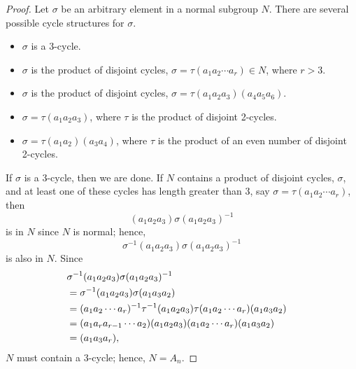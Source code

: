 {%
 
 
\begin{proof}
Let $\sigma$ be an arbitrary element in a normal subgroup $N$. There
are several possible cycle structures for $\sigma$.
\begin{itemize}
 
\item
$\sigma$ is a 3-cycle.
 
\item
$\sigma$ is the product of disjoint cycles, $\sigma = \tau(a_1 a_2
\cdots a_r) \in N$, where $r >3$.
 
 
\item
$\sigma$ is the product of disjoint cycles, $\sigma = \tau(a_1 a_2
a_3)(a_4 a_5 a_6)$.
 
 
\item
$\sigma = \tau(a_1 a_2 a_3)$, where $\tau$ is the product of disjoint
2-cycles. 
 
 
\item
$\sigma =
\tau (a_1 a_2) (a_3 a_4) $, where $\tau$ is the product of an even
number of disjoint 2-cycles. 
 
 
\end{itemize}
If $\sigma$ is a $3$-cycle, then we are done. If $N$ contains a
product of disjoint cycles, $\sigma$, and at least one of these cycles
has length greater than 3, say $\sigma = \tau(a_1 a_2 \cdots a_r)$,
then   
\[
(a_1 a_2 a_3)\sigma(a_1 a_2 a_3)^{-1}
\]
is in $N$ since $N$ is normal; hence,
\[
\sigma^{-1}(a_1 a_2 a_3)\sigma(a_1 a_2 a_3)^{-1}
\]
is also in $N$. Since
\begin{align*}
\lefteqn{\sigma^{-1}(a_1 a_2 a_3)\sigma(a_1 a_2 a_3)^{-1} } \\
& = \sigma^{-1}(a_1 a_2 a_3)\sigma(a_1 a_3 a_2) \\
& = (a_1 a_2 \cdots a_r)^{-1}\tau^{-1}(a_1 a_2 a_3) 
      \tau(a_1 a_2 \cdots a_r)(a_1 a_3 a_2) \\
& = (a_1 a_r a_{r-1} \cdots a_2 )(a_1 a_2 a_3) 
      (a_1 a_2 \cdots a_r)(a_1 a_3 a_2) \\
& = (a_1 a_3 a_r),
\end{align*}
$N$ must contain a 3-cycle; hence, $N = A_n$.
 
 
 

\end{proof}}

